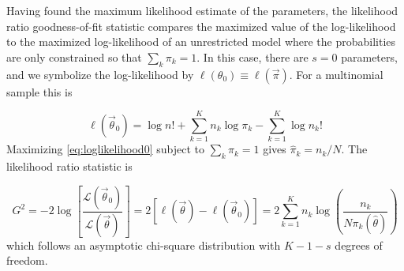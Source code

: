 Having found the maximum likelihood estimate of the parameters, the
likelihood ratio
goodness-of-fit \GSQ{} statistic compares the maximized value of the
log-likelihood to the maximized log-likelihood of an unrestricted model
where the probabilities are only constrained so that $\sum_k \pi_k =1$.
In this case, there are $s=0$ parameters, and we symbolize the log-likelihood
by $ \ell(\theta_0) \equiv \ell(\vec{\pi})$.  For a multinomial sample this is

\begin{equation}\label{eq:loglikelihood0}
 \ell(\vec{\theta}_0)  = \log n ! +
  \sum_{k=1}^K n_k \log \pi_k  - \sum_{k=1}^K \log n_k !
\end{equation}
Maximizing \eqref{eq:loglikelihood0} subject to $\sum_k \pi_k =1$
gives $\hat{\pi}_k = n_k / N$.
The likelihood ratio statistic is

\begin{equation}\label{eq:likeratio}
 G^2 = -2 \log \left[
 \frac{\mathcal{L}(\vec{\theta}_0)}{\mathcal{L}(\vec{\theta})}
 \right]
 = 2 [ \ell(\vec{\theta}) - \ell(\vec{\theta}_0) ]
 = 2 \sum_{k=1}^{K} n_k \log \left( \frac{n_k}{N \pi_k (\hat{\theta}) } \right)
\end{equation}
which follows an asymptotic chi-square distribution with $K-1-s$ degrees
of freedom.

